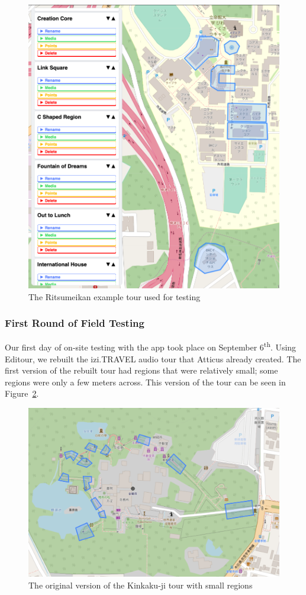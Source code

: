 \documentclass[a4paper, 10pt, american, titlepage]{article}
\begin{document}
\begin{figure}[h]
	\centering
	\includegraphics[width=.5\textwidth]{ritsu-tour.png}
	\caption{The Ritsumeikan example tour used for testing}
	\label{fig:ritsuTour}
\end{figure}

\subsubsection{First Round of Field Testing}
\label{sec:firstRoundOfFieldTesting}

Our first day of on-site testing with the app took place on September
6\textsuperscript{th}. Using Editour, we rebuilt the izi.TRAVEL audio tour that
Atticus already created. The first version of the rebuilt tour had regions that
were relatively small; some regions were only a few meters across. This version
of the tour can be seen in Figure~\ref{fig:kinkakujiTour}.

\begin{figure}[h]
	\centering
	\includegraphics[width=\textwidth]{kinkakuji-tour.png}
	\caption[The original version of the Kinkaku-ji tour]{The original version
		of the Kinkaku-ji tour with small regions}
	\label{fig:kinkakujiTour}
\end{figure}
\end{document}
